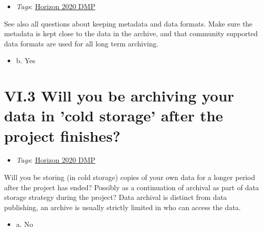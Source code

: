 \documentclass[a4paper,12pt]{report}
\begin{document}
\begin{itemize}
  \item \textit{Tags}: \ul{Horizon 2020 DMP}
  \end{itemize}


\noindent
\begin{markdown}
See also all questions about keeping metadata and data formats. Make sure the metadata is kept close to the data in the archive, and that community supported data formats are used for all long term archiving.
\end{markdown}



\begin{itemize}
  \item[\CheckmarkBold] b. Yes
\end{itemize}






\section*{\protect\textcolor{colorSecId}{VI.3} Will you be archiving your data in 'cold storage' after the project finishes?}

\label{d5b27482-b598-4b8c-b534-417d4ad27394.f9d84278-b61d-4314-94e9-12644bfa1d00}


\begin{itemize}
  \item \textit{Tags}: \ul{Horizon 2020 DMP}
  \end{itemize}


\noindent
\begin{markdown}
Will you be storing (in cold storage) copies of your own data for a longer period after the project has ended? Possibly as a continuation of archival as part of data storage strategy during the project? Data archival is distinct from data publishing, an archive is usually strictly limited in who can access the data.
\end{markdown}



\begin{itemize}
  \item[\CheckmarkBold] a. No
\end{itemize}
\end{document}
